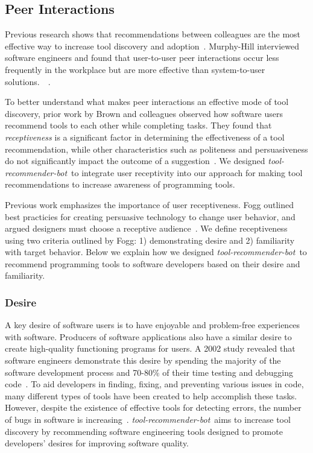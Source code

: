 \documentclass[sigconf,review,anonymous]{acmart}
\newcommand{\tool}{\textsl{tool-recommender-bot}}
\begin{document}
\subsection{Peer Interactions}
Previous research shows that recommendations between colleagues are the most effective way to increase tool discovery and adoption~\cite{MurphyHill2011PeerInteraction}. Murphy-Hill interviewed software engineers and found that user-to-user peer interactions occur less frequently in the workplace but are more effective than system-to-user solutions.~\cite{MurphyHill2011PeerInteraction}~\cite{Murphy-Hill2015HowDoUsers}. 

To better understand what makes peer interactions an effective mode of tool discovery, prior work by Brown and colleagues observed how software users recommend tools to each other while completing tasks. They found that \emph{receptiveness} is a significant factor in determining the effectiveness of a tool recommendation, while other characteristics such as politeness and persuasiveness do not significantly impact the outcome of a suggestion~\cite{vlhcc17}. We designed \tool~to integrate user receptivity into our approach for making tool recommendations to increase awareness of programming tools.

Previous work emphasizes the importance of user receptiveness. Fogg outlined best practicies for creating persuasive technology to change user behavior, and argued designers must choose a receptive audience~\cite{FoggPersuasive}. We define receptiveness using two criteria outlined by Fogg: 1) demonstrating desire and 2) familiarity with target behavior. Below we explain how we designed \tool~to recommend programming tools to software developers based on their desire and familiarity.

\subsubsection{Desire}

A key desire of software users is to have enjoyable and problem-free experiences with software. Producers of software applications also have a similar desire to create high-quality functioning programs for users. A 2002 study revealed that software engineers demonstrate this desire by spending the majority of the software development process and 70-80\% of their time testing and debugging code~\cite{NIST}. To aid developers in finding, fixing, and preventing various issues in code, many different types of tools have been created to help accomplish these tasks. However, despite the existence of effective tools for detecting errors, the number of bugs in software is increasing~\cite{HaveThingsChanged}. \tool~aims to increase tool discovery by recommending software engineering tools designed to promote developers' desires for improving software quality.
\end{document}
